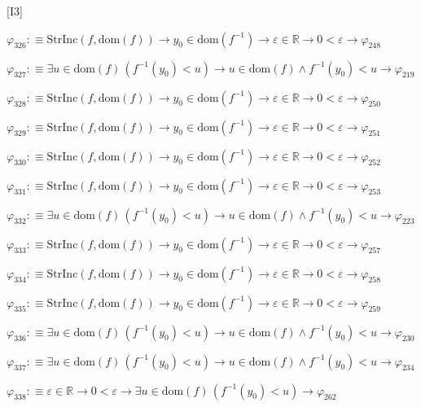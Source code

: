 \begin{fullproof}{[I3]}
\begin{abbrevlist}
\item $\varphi_{326} :\equiv \mathrm{StrInc}(f,\mathrm{dom}(f)) \to y_{0} \in \mathrm{dom}(f^{-1}) \to \varepsilon \in \mathbb{R} \to 0 < \varepsilon \to \varphi_{248}$
\item $\varphi_{327} :\equiv \exists u \in \mathrm{dom}(f)\,(f^{-1}(y_{0}) < u) \to u \in \mathrm{dom}(f) \land f^{-1}(y_{0}) < u \to \varphi_{219}$
\item $\varphi_{328} :\equiv \mathrm{StrInc}(f,\mathrm{dom}(f)) \to y_{0} \in \mathrm{dom}(f^{-1}) \to \varepsilon \in \mathbb{R} \to 0 < \varepsilon \to \varphi_{250}$
\item $\varphi_{329} :\equiv \mathrm{StrInc}(f,\mathrm{dom}(f)) \to y_{0} \in \mathrm{dom}(f^{-1}) \to \varepsilon \in \mathbb{R} \to 0 < \varepsilon \to \varphi_{251}$
\item $\varphi_{330} :\equiv \mathrm{StrInc}(f,\mathrm{dom}(f)) \to y_{0} \in \mathrm{dom}(f^{-1}) \to \varepsilon \in \mathbb{R} \to 0 < \varepsilon \to \varphi_{252}$
\item $\varphi_{331} :\equiv \mathrm{StrInc}(f,\mathrm{dom}(f)) \to y_{0} \in \mathrm{dom}(f^{-1}) \to \varepsilon \in \mathbb{R} \to 0 < \varepsilon \to \varphi_{253}$
\item $\varphi_{332} :\equiv \exists u \in \mathrm{dom}(f)\,(f^{-1}(y_{0}) < u) \to u \in \mathrm{dom}(f) \land f^{-1}(y_{0}) < u \to \varphi_{223}$
\item $\varphi_{333} :\equiv \mathrm{StrInc}(f,\mathrm{dom}(f)) \to y_{0} \in \mathrm{dom}(f^{-1}) \to \varepsilon \in \mathbb{R} \to 0 < \varepsilon \to \varphi_{257}$
\item $\varphi_{334} :\equiv \mathrm{StrInc}(f,\mathrm{dom}(f)) \to y_{0} \in \mathrm{dom}(f^{-1}) \to \varepsilon \in \mathbb{R} \to 0 < \varepsilon \to \varphi_{258}$
\item $\varphi_{335} :\equiv \mathrm{StrInc}(f,\mathrm{dom}(f)) \to y_{0} \in \mathrm{dom}(f^{-1}) \to \varepsilon \in \mathbb{R} \to 0 < \varepsilon \to \varphi_{259}$
\item $\varphi_{336} :\equiv \exists u \in \mathrm{dom}(f)\,(f^{-1}(y_{0}) < u) \to u \in \mathrm{dom}(f) \land f^{-1}(y_{0}) < u \to \varphi_{230}$
\item $\varphi_{337} :\equiv \exists u \in \mathrm{dom}(f)\,(f^{-1}(y_{0}) < u) \to u \in \mathrm{dom}(f) \land f^{-1}(y_{0}) < u \to \varphi_{234}$
\item $\varphi_{338} :\equiv \varepsilon \in \mathbb{R} \to 0 < \varepsilon \to \exists u \in \mathrm{dom}(f)\,(f^{-1}(y_{0}) < u) \to \varphi_{262}$

\end{abbrevlist}
\end{fullproof}
